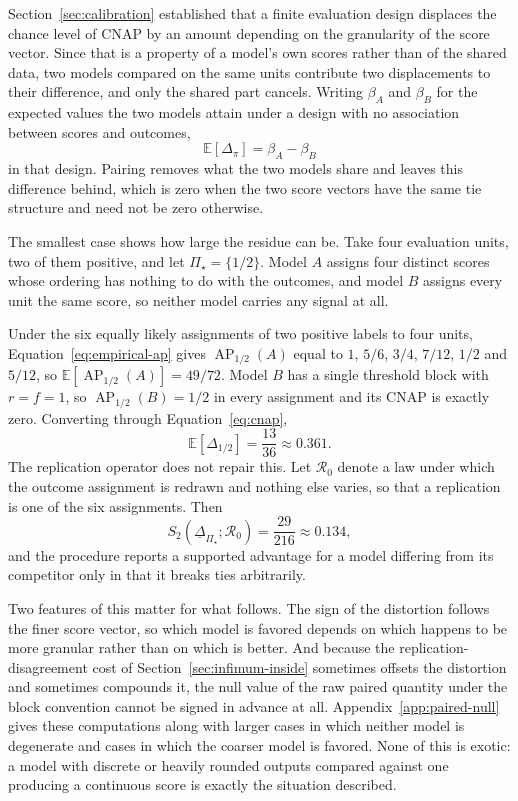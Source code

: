 \documentclass[11pt]{article}
\newcommand{\AP}{\operatorname{AP}}
\newcommand{\Regime}{\mathcal{R}}
\newcommand{\PSet}{\Pi_\star}
\newcommand{\E}{\mathbb{E}}
\newcommand{\RobDelta}{\underline{\Delta}_{\PSet}}
\theoremstyle{remark}
\begin{document}
Section~\ref{sec:calibration} established that a finite evaluation design displaces the chance level of CNAP by an amount depending on the granularity of the score vector. Since that is a property of a model's own scores rather than of the shared data, two models compared on the same units contribute two displacements to their difference, and only the shared part cancels. Writing $\beta_A$ and $\beta_B$ for the expected values the two models attain under a design with no association between scores and outcomes,
\[
\E[\Delta_\pi]
=
\beta_A-\beta_B
\]
in that design. Pairing removes what the two models share and leaves this difference behind, which is zero when the two score vectors have the same tie structure and need not be zero otherwise.

The smallest case shows how large the residue can be. Take four evaluation units, two of them positive, and let $\PSet=\{1/2\}$. Model $A$ assigns four distinct scores whose ordering has nothing to do with the outcomes, and model $B$ assigns every unit the same score, so neither model carries any signal at all.

Under the six equally likely assignments of two positive labels to four units, Equation~\eqref{eq:empirical-ap} gives $\AP_{1/2}(A)$ equal to $1$, $5/6$, $3/4$, $7/12$, $1/2$ and $5/12$, so $\E[\AP_{1/2}(A)]=49/72$. Model $B$ has a single threshold block with $r=f=1$, so $\AP_{1/2}(B)=1/2$ in every assignment and its CNAP is exactly zero. Converting through Equation~\eqref{eq:cnap},
\[
\E\left[\Delta_{1/2}\right]
=
\frac{13}{36}
\approx
0.361 .
\]
The replication operator does not repair this. Let $\Regime_0$ denote a law under which the outcome assignment is redrawn and nothing else varies, so that a replication is one of the six assignments. Then
\[
S_2(\RobDelta;\Regime_0)
=
\frac{29}{216}
\approx
0.134 ,
\]
and the procedure reports a supported advantage for a model differing from its competitor only in that it breaks ties arbitrarily.

Two features of this matter for what follows. The sign of the distortion follows the finer score vector, so which model is favored depends on which happens to be more granular rather than on which is better. And because the replication-disagreement cost of Section~\ref{sec:infimum-inside} sometimes offsets the distortion and sometimes compounds it, the null value of the raw paired quantity under the block convention cannot be signed in advance at all. Appendix~\ref{app:paired-null} gives these computations along with larger cases in which neither model is degenerate and cases in which the coarser model is favored. None of this is exotic: a model with discrete or heavily rounded outputs compared against one producing a continuous score is exactly the situation described.
\end{document}
